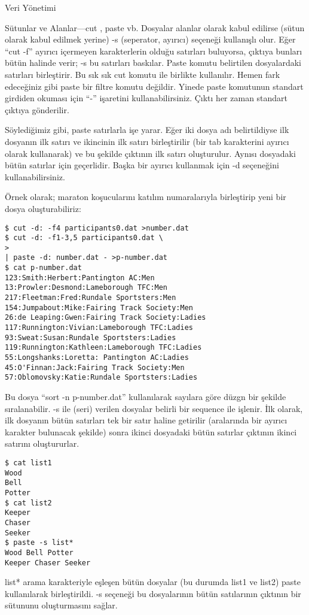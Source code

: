 \begin{section}{Veri Yönetimi}
\begin{subsection}{Sütunlar ve Alanlar—cut , paste vb.}
Dosyalar alanlar olarak kabul edilirse (sütun olarak kabul edilmek yerine) -s (seperator, ayırıcı) seçeneği kullanışlı olur.  Eğer “cut -f” ayırıcı içermeyen karakterlerin olduğu satırları buluyorsa, çıktıya bunları bütün halinde verir; -s bu satırları baskılar. Paste komutu belirtilen dosyalardaki satırları birleştirir. Bu sık sık cut komutu ile birlikte kullanılır. Hemen fark edeceğiniz gibi paste bir filtre komutu değildir. Yinede paste komutunun standart girdiden okuması için “-” işaretini kullanabilirsiniz. Çıktı her zaman standart çıktıya gönderilir. 

Söylediğimiz gibi, paste satırlarla işe yarar. Eğer iki dosya adı belirtildiyse ilk dosyanın ilk satırı ve ikincinin ilk satırı birleştirilir (bir tab karakterini ayırıcı olarak kullanarak) ve bu şekilde çıktının ilk satırı oluşturulur. Aynısı dosyadaki bütün satırlar için geçerlidir. Başka bir ayırıcı kullanmak için -d seçeneğini kullanabilirsiniz.

Örnek olarak; maraton koşucularını katılım numaralarıyla birleştirip yeni bir dosya oluşturabiliriz:
\begin{verbatim}
$ cut -d: -f4 participants0.dat >number.dat 
$ cut -d: -f1-3,5 participants0.dat \ 
> 
| paste -d: number.dat - >p-number.dat 
$ cat p-number.dat 
123:Smith:Herbert:Pantington AC:Men 
13:Prowler:Desmond:Lameborough TFC:Men 
217:Fleetman:Fred:Rundale Sportsters:Men 
154:Jumpabout:Mike:Fairing Track Society:Men 
26:de Leaping:Gwen:Fairing Track Society:Ladies 
117:Runnington:Vivian:Lameborough TFC:Ladies 
93:Sweat:Susan:Rundale Sportsters:Ladies 
119:Runnington:Kathleen:Lameborough TFC:Ladies 
55:Longshanks:Loretta: Pantington AC:Ladies 
45:O'Finnan:Jack:Fairing Track Society:Men 
57:Oblomovsky:Katie:Rundale Sportsters:Ladies
\end{verbatim}

Bu dosya “sort -n p-number.dat” kullanılarak sayılara göre düzgn bir şekilde sıralanabilir. -s ile (seri) verilen dosyalar belirli bir sequence ile işlenir. İlk olarak, ilk dosyanın bütün satırları tek bir satır haline getirilir (aralarında bir ayırıcı karakter bulunacak şekilde) sonra ikinci dosyadaki bütün satırlar çıktının ikinci satırını oluştururlar.
\begin{verbatim}
$ cat list1
Wood
Bell
Potter
$ cat list2
Keeper
Chaser
Seeker
$ paste -s list*
Wood Bell Potter
Keeper Chaser Seeker
\end{verbatim}

list* arama karakteriyle eşleşen bütün dosyalar (bu durumda list1 ve list2) paste kullanılarak birleştirildi. -s seçeneği bu dosyalarının bütün satılarının çıktının bir sütununu oluşturmasını sağlar. 


\end{subsection}
\end{section}
